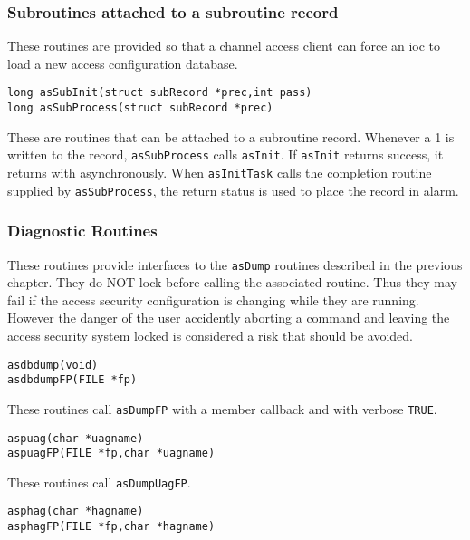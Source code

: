 \subsubsection{Subroutines attached to a subroutine record}

These routines are provided so that a channel access client can force an ioc to load a new access configuration database.

\begin{verbatim}
long asSubInit(struct subRecord *prec,int pass)
long asSubProcess(struct subRecord *prec)
\end{verbatim}

These are routines that can be attached to a subroutine record. Whenever a 1 is written to the record, \verb|asSubProcess| 
calls \verb|asInit|. If \verb|asInit| returns success, it returns with asynchronously. When \verb|asInitTask| calls the completion 
routine supplied by \verb|asSubProcess|, the return status is used to place the record in alarm.

\subsubsection{Diagnostic Routines}

These routines provide interfaces to the \verb|asDump| routines described in the previous chapter. They do NOT lock before 
calling the associated routine. Thus they may fail if the access security configuration is changing while they are running. 
However the danger of the user accidently aborting a command and leaving the access security system locked is 
considered a risk that should be avoided.

\begin{verbatim}
asdbdump(void)
asdbdumpFP(FILE *fp)
\end{verbatim}

These routines call \verb|asDumpFP| with a member callback and with verbose \verb|TRUE|.

\begin{verbatim}
aspuag(char *uagname)
aspuagFP(FILE *fp,char *uagname)
\end{verbatim}

These routines call \verb|asDumpUagFP|.

\begin{verbatim}
asphag(char *hagname)
asphagFP(FILE *fp,char *hagname)
\end{verbatim}

